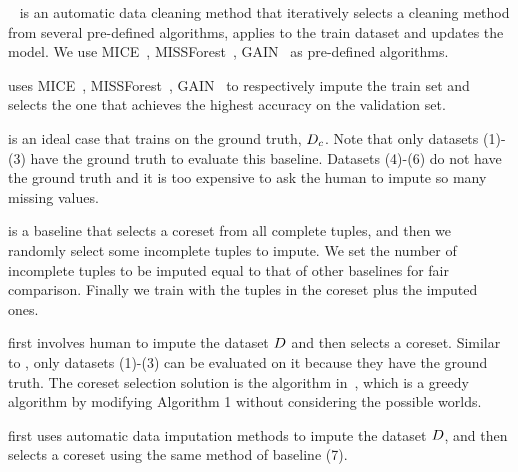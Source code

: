 ~\cite{DBLP:journals/corr/abs-1711-01299} is an automatic  data cleaning method that iteratively selects a cleaning method from several pre-defined algorithms, applies to the train dataset and  updates the model.  We use MICE~\cite{royston2011multiple}, MISSForest~\cite{DBLP:journals/bioinformatics/StekhovenB12}, GAIN~\cite{DBLP:conf/icml/YoonJS18} as pre-defined algorithms.


  uses MICE~\cite{royston2011multiple}, MISSForest~\cite{DBLP:journals/bioinformatics/StekhovenB12}, GAIN~\cite{DBLP:conf/icml/YoonJS18} to respectively impute the train set and selects the one that achieves the highest accuracy on the validation set.

 is an ideal case that trains on the ground truth, \ie $D_c$. Note that only datasets (1)-(3) have the ground truth to evaluate this baseline.  Datasets (4)-(6) do not have the ground truth and it is  too expensive to ask the human to impute so many missing values.

 is a baseline that selects a coreset from all complete tuples, and then we randomly select some incomplete tuples to impute. We set the number of incomplete tuples to be imputed equal to that of  other baselines for fair comparison. Finally we train with the tuples in the coreset plus the  imputed ones.






 first involves human to impute the dataset $D$ and then selects a coreset. Similar to \truth, only datasets (1)-(3) can be evaluated on it because they have the ground truth. The coreset selection solution is the algorithm in~\cite{DBLP:conf/icml/MirzasoleimanBL20}, which is a greedy algorithm by modifying Algorithm 1 without considering the possible worlds.


 first uses automatic data imputation methods to impute the dataset $D$, and then selects a coreset using the same method of baseline (7).

